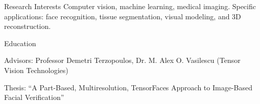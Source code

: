\documentclass{resume}
\begin{document}
\maketitle
\thispagestyle{empty} %

\vspace{-0.5em}

\begin{component}{Research Interests}
Computer vision, machine learning, medical imaging.
Specific applications: face recognition, tissue segmentation, visual modeling, and 3D reconstruction.
\end{component}

\vspace{0.5em}

\begin{component}{Education}

    \hspace{1em} Advisors: Professor Demetri Terzopoulos, Dr. M. Alex O. Vasilescu (Tensor Vision Technologies)

    \hspace{1em} Thesis: ``A Part-Based, Multiresolution, TensorFaces Approach to Image-Based Facial Verification''

\end{component}

\vspace{0.5em}
\end{document}
